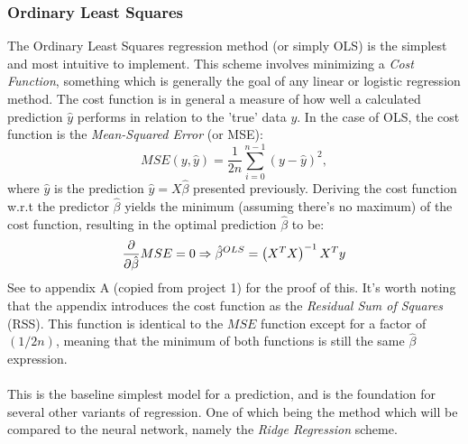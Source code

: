         \subsubsection{Ordinary Least Squares}
            The Ordinary Least Squares regression method (or simply OLS) is the simplest and most intuitive to implement. This scheme involves minimizing a \textit{Cost Function}, something which is generally the goal of any linear or logistic regression method. The cost function is in general a measure of how well a calculated prediction $\hat{y}$ performs in relation to the 'true' data $y$. In the case of OLS, the cost function is the \textit{Mean-Squared Error} (or MSE):
            \begin{equation}\label{eq:MSE}
                MSE(y, \hat{y})=\frac1{2n}\sum_{i=0}^{n-1} \left( y-\hat{y} \right)^2,
            \end{equation}
            where $\hat{y}$ is the prediction $\hat{y}=X\hat{\beta}$ presented previously. Deriving the cost function w.r.t the predictor $\hat{\beta}$ yields the minimum (assuming there's no maximum) of the cost function, resulting in the optimal prediction $\hat{\beta}$ to be:
            \begin{equation}
                \pdv{}{\hat{\beta}}MSE=0\Rightarrow \hat{\beta}^{OLS} = \left( X^TX \right)^{-1}X^Ty
            \end{equation}
            See to appendix A (copied from project 1) for the proof of this. It's worth noting that the appendix introduces the cost function as the \textit{Residual Sum of Squares} (RSS). This function is identical to the $MSE$ function except for a factor of $(1/2n)$, meaning that the minimum of both functions is still the same $\hat{\beta}$ expression. \\\\
            This is the baseline simplest model for a prediction, and is the foundation for several other variants of regression. One of which being the method which will be compared to the neural network, namely the \textit{Ridge Regression} scheme.
            
